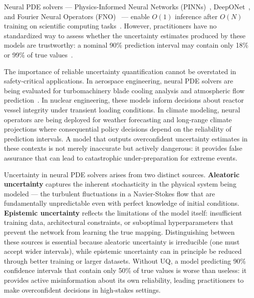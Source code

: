 \documentclass[12pt,a4paper]{article}
\theoremstyle{plain}
\begin{document}
Neural PDE solvers --- Physics-Informed Neural Networks (PINNs)~\citep{raissi2019physics},
DeepONet~\citep{lu2021deeponet}, and Fourier Neural Operators
(FNO)~\citep{li2020fno} --- enable $O(1)$ inference after $O(N)$ training
on scientific computing tasks~\citep{takamoto2022pdebench,wang2023omniarch}.
However, practitioners have no standardized way to assess whether
the uncertainty estimates produced by these models are trustworthy:
a nominal 90\% prediction interval may contain only 18\% or 99\% of
true values~\citep{ovadia2019uncertainty,esposito2024conformal}.

The importance of reliable uncertainty quantification cannot be overstated
in safety-critical applications. In aerospace engineering, neural PDE solvers
are being evaluated for turbomachinery blade cooling analysis and atmospheric
flow prediction~\citep{takamoto2022pdebench}. In nuclear engineering, these
models inform decisions about reactor vessel integrity under transient
loading conditions. In climate modeling, neural operators are being deployed
for weather forecasting and long-range climate projections where consequential
policy decisions depend on the reliability of prediction intervals.
A model that outputs overconfident uncertainty estimates in these contexts
is not merely inaccurate but actively dangerous: it provides false assurance
that can lead to catastrophic under-preparation for extreme events.

Uncertainty in neural PDE solvers arises from two distinct sources.
\textbf{Aleatoric uncertainty} captures the inherent stochasticity in the
physical system being modeled --- the turbulent fluctuations in a Navier-Stokes
flow that are fundamentally unpredictable even with perfect knowledge of
initial conditions. \textbf{Epistemic uncertainty} reflects the limitations
of the model itself: insufficient training data, architectural constraints,
or suboptimal hyperparameters that prevent the network from learning the
true mapping. Distinguishing between these sources is essential because
aleatoric uncertainty is irreducible (one must accept wider intervals),
while epistemic uncertainty can in principle be reduced through better
training or larger datasets. Without UQ, a model predicting 90\% confidence
intervals that contain only 50\% of true values is worse than useless: it
provides active misinformation about its own reliability, leading practitioners
to make overconfident decisions in high-stakes settings.
\end{document}
